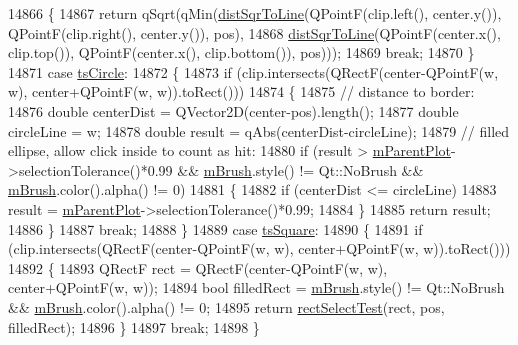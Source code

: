 \begin{DoxyCode}
14866     \{
14867       \textcolor{keywordflow}{return} qSqrt(qMin(\hyperlink{a00022_acdca343717d625b8abb3c3e38c0ed39d}{distSqrToLine}(QPointF(clip.left(), center.y()), QPointF(clip.right(), 
      center.y()), pos),
14868                         \hyperlink{a00022_acdca343717d625b8abb3c3e38c0ed39d}{distSqrToLine}(QPointF(center.x(), clip.top()), QPointF(center.x(), 
      clip.bottom()), pos)));
14869       \textcolor{keywordflow}{break};
14870     \}
14871     \textcolor{keywordflow}{case} \hyperlink{a00042_a2f05ddb13978036f902ca3ab47076500ae2252c28f4842880d71e9f94e69de94e}{tsCircle}:
14872     \{
14873       \textcolor{keywordflow}{if} (clip.intersects(QRectF(center-QPointF(w, w), center+QPointF(w, w)).toRect()))
14874       \{
14875         \textcolor{comment}{// distance to border:}
14876         \textcolor{keywordtype}{double} centerDist = QVector2D(center-pos).length();
14877         \textcolor{keywordtype}{double} circleLine = w;
14878         \textcolor{keywordtype}{double} result = qAbs(centerDist-circleLine);
14879         \textcolor{comment}{// filled ellipse, allow click inside to count as hit:}
14880         \textcolor{keywordflow}{if} (result > \hyperlink{a00044_aa2a528433e44db02b8aef23c1f9f90ed}{mParentPlot}->selectionTolerance()*0.99 && \hyperlink{a00042_a6597be63a17a266233941354200b2340}{mBrush}.style() != 
      Qt::NoBrush && \hyperlink{a00042_a6597be63a17a266233941354200b2340}{mBrush}.color().alpha() != 0)
14881         \{
14882           \textcolor{keywordflow}{if} (centerDist <= circleLine)
14883             result = \hyperlink{a00044_aa2a528433e44db02b8aef23c1f9f90ed}{mParentPlot}->selectionTolerance()*0.99;
14884         \}
14885         \textcolor{keywordflow}{return} result;
14886       \}
14887       \textcolor{keywordflow}{break};
14888     \}
14889     \textcolor{keywordflow}{case} \hyperlink{a00042_a2f05ddb13978036f902ca3ab47076500a4ed5f01f2c5fd86d980366d79f481b9b}{tsSquare}:
14890     \{
14891       \textcolor{keywordflow}{if} (clip.intersects(QRectF(center-QPointF(w, w), center+QPointF(w, w)).toRect()))
14892       \{
14893         QRectF rect = QRectF(center-QPointF(w, w), center+QPointF(w, w));
14894         \textcolor{keywordtype}{bool} filledRect = \hyperlink{a00042_a6597be63a17a266233941354200b2340}{mBrush}.style() != Qt::NoBrush && \hyperlink{a00042_a6597be63a17a266233941354200b2340}{mBrush}.color().alpha() != 0;
14895         \textcolor{keywordflow}{return} \hyperlink{a00022_a4c0e14c4e92df91174cb7183fb363069}{rectSelectTest}(rect, pos, filledRect);
14896       \}
14897       \textcolor{keywordflow}{break};
14898     \}

\end{DoxyCode}

